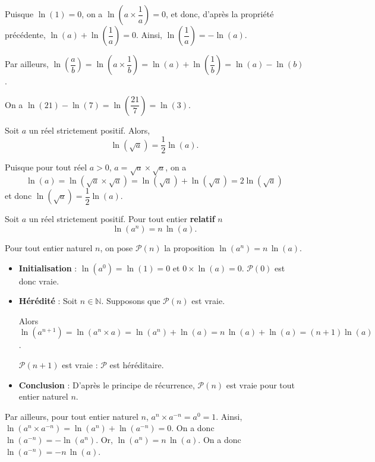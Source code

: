 \documentclass[11pt,fleqn, openany]{book} %
\begin{document}
\begin{demonstration}Puisque $\ln(1)=0$, on a $\ln \left(a \times \dfrac{1}{a}\right)=0$, et donc, d'après la propriété précédente, $\ln(a) + \ln \left(\dfrac{1}{a}\right)=0$. Ainsi, $\ln \left(\dfrac{1}{a}\right)=-\ln(a).$

Par ailleurs, $\ln\left(\dfrac{a}{b}\right)=\ln\left(a \times \dfrac{1}{b}\right)=\ln(a)+\ln\left(\dfrac{1}{b}\right)=\ln(a)-\ln(b)$.\end{demonstration}

\begin{example}On a $\ln(21)-\ln(7)=\ln\left(\dfrac{21}{7}\right)=\ln(3)$.\end{example}

\begin{proposition}Soit $a$ un réel strictement positif. Alors,
\[\ln (\sqrt{a})=\dfrac{1}{2}\ln(a).\]\vspace{-0.5cm}\end{proposition}

\begin{demonstration}Puisque pour tout réel $a>0$, $a=\sqrt{a} \times \sqrt{a}$, on a \[\ln(a)=\ln(\sqrt{a} \times \sqrt{a})=\ln( \sqrt{a})+ \ln(\sqrt{a})=2\ln(\sqrt{a})\] et donc $\ln(\sqrt{a})=\dfrac{1}{2}\ln(a)$.\end{demonstration}

\begin{proposition}Soit $a$ un réel strictement positif. Pour tout entier \textbf{relatif} $n$
\[\ln(a^n)=n\,\ln(a).\]\vspace{-0.5cm}\end{proposition}

\begin{demonstration}Pour tout entier naturel $n$, on pose $\mathcal{P}(n)$ la proposition $\ln(a^n)=n\,\ln(a)$.
\begin{itemize}
\item \textbf{Initialisation} : $\ln(a^0)=\ln(1)=0$ et $0 \times \ln(a)=0$. $\mathcal{P}(0)$ est donc vraie.
\item \textbf{Hérédité} : Soit $n \in \mathbb{N}$. Supposons que $\mathcal{P}(n)$ est vraie. 

Alors $\ln(a^{n+1})=\ln(a^n \times a)=\ln(a^n)+\ln(a)=n\,\ln(a)+\ln(a)=(n+1)\ln(a)$. 

$\mathcal{P}(n+1)$ est vraie : $\mathcal{P}$ est héréditaire.
\item \textbf{Conclusion} : D'après le principe de récurrence, $\mathcal{P}(n)$ est vraie pour tout entier naturel $n$.
\end{itemize}
Par ailleurs, pour tout entier naturel $n$, $a^n \times a^{-n}=a^0=1$. Ainsi, $\ln(a^n \times a^{-n})=\ln(a^n)+\ln(a^{-n})=0$. On a donc $\ln(a^{-n})=-\ln(a^n)$. Or, $\ln(a^n)=n\, \ln(a)$. On a donc $\ln(a^{-n})=-n\, \ln(a)$.
\end{demonstration}
\end{document}
